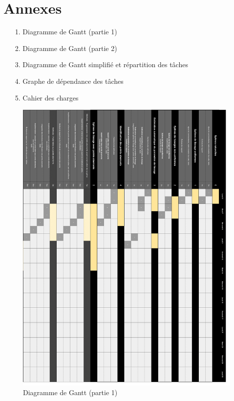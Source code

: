 \documentclass[a4paper,10pt]{article} %
\begin{document}
\section*{Annexes}

\begin{itemize}
\item[1.] Diagramme de Gantt (partie 1)
\item[2.] Diagramme de Gantt (partie 2)
\item[3.] Diagramme de Gantt simplifié et répartition des tâches
\item[4.] Graphe de dépendance des tâches
\item[5.] Cahier des charges
\end{itemize}
\begin{figure}
\begin{center}
\includegraphics[width=16cm]{p1.png} 
\end{center}
\caption{Diagramme de Gantt (partie 1)}
\label{DiagG1}
\end{figure}
\end{document}
